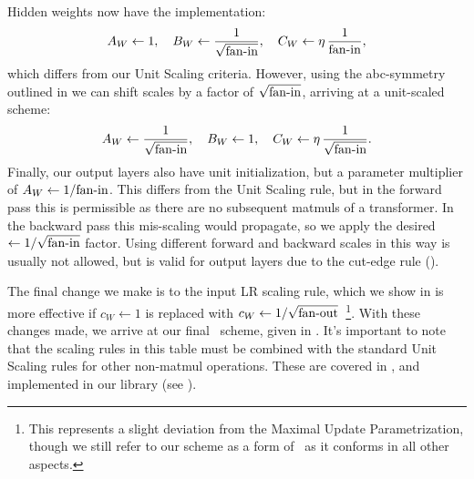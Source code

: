 Hidden weights now have the implementation:
\begin{align} \label{eq:mup_comparison}
    A_W \leftarrow 1,
    \quad
    B_W \leftarrow \frac{1}{\sqrt{\mathrm{fan{\text -}in}}},
    \quad
    C_W \leftarrow \eta \, \frac{1}{\mathrm{fan{\text -}in}},
\end{align}
which differs from our Unit Scaling criteria. However, using the abc-symmetry outlined in  we can shift scales by a factor of $\sqrt{\mathrm{fan{\text -}in}}$, arriving at a unit-scaled scheme:
\begin{align} \label{eq:mup_comparison_2}
    A_W \leftarrow \frac{1}{\sqrt{\mathrm{fan{\text -}in}}},
    \quad
    B_W \leftarrow 1,
    \quad
    C_W \leftarrow \eta \, \frac{1}{\sqrt{\mathrm{fan{\text -}in}}}.
\end{align}
Finally, our output layers also have unit initialization, but a parameter multiplier of $A_W \leftarrow 1/\mathrm{fan{\text -}in}$. This differs from the Unit Scaling rule, but in the forward pass this is permissible as there are no subsequent matmuls of a transformer. In the backward pass this mis-scaling would propagate, so we apply the desired $\leftarrow 1/\sqrt{\mathrm{fan{\text -}in}}$ factor. Using different forward and backward scales in this way is usually not allowed, but is valid for output layers due to the cut-edge rule ().

The final change we make is to the input LR scaling rule, which we show in  is more effective if $c_W \leftarrow 1$ is replaced with $c_W \leftarrow 1 / \sqrt{\mathrm{fan{\text -}out}}$~\footnote{This represents a slight deviation from the Maximal Update Parametrization, though we still refer to our scheme as a form of \mup\ as it conforms in all other aspects.}. With these changes made, we arrive at our final \umup\ scheme, given in . It's important to note that the scaling rules in this table must be combined with the standard Unit Scaling rules for other non-matmul operations. These are covered in , and implemented in our library (see ).

